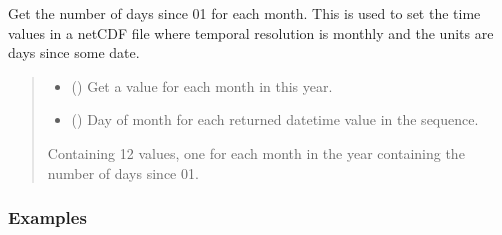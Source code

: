 \documentclass[letterpaper,10pt,english]{sphinxmanual}
\begin{document}
\begin{fulllineitems}
\label{\detokenize{misc:glomar_gridding.utils.days_since_by_month}}
\pysigstartsignatures
\pysiglinewithargsret
{}
{\sphinxparamcomma {}}
{}
\pysigstopsignatures
\sphinxAtStartPar
Get the number of days since \sphinxhyphen{}01\sphinxhyphen{} for each month. This is used
to set the time values in a netCDF file where temporal resolution is monthly
and the units are days since some date.
\begin{quote}\begin{description}
\begin{itemize}
\item {}
\sphinxAtStartPar
{} () \textendash{} Get a value for each month in this year.

\item {}
\sphinxAtStartPar
{} () \textendash{} Day of month for each returned datetime value in the sequence.

\end{itemize}

\sphinxAtStartPar
Containing 12 values, one for each month in the year containing the
number of days since \sphinxhyphen{}01\sphinxhyphen{}.

\sphinxAtStartPar
{}

\end{description}\end{quote}
\subsubsection*{Examples}

\begin{sphinxVerbatim}[commandchars=\\\{\}]
 
\end{sphinxVerbatim}

\end{fulllineitems}
\end{document}
